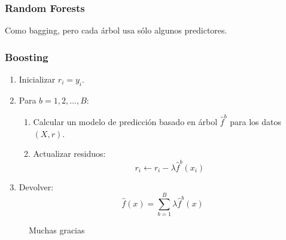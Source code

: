 \documentclass{beamer}
\theoremstyle{definition}
\begin{document}
\begin{frame}
\frametitle{Random Forests}
Como bagging, pero cada árbol usa sólo algunos predictores.
\end{frame}

\begin{frame}
\frametitle{Boosting}
\begin{enumerate}
	\item<1-> Inicializar $r_i = y_i$.
	\item<2-> Para $b=1,2,\dots,B$:
	\begin{enumerate}
		\item Calcular un modelo de predicción basado en árbol $\widehat{f}^b$ para los datos $(X,r)$.
		\item Actualizar residuos:
		\[ r_i \leftarrow r_i - \lambda \widehat{f}^b(x_i) \]
	\end{enumerate}
	\item<3-> Devolver:
	\[ \widehat{f}(x) = \sum_{b=1}^B \lambda \widehat{f}^b(x) \]
\end{enumerate}
\end{frame}



\begin{frame}
\begin{figure}[h!]
Muchas gracias
\end{figure}
\end{frame}
\end{document}
